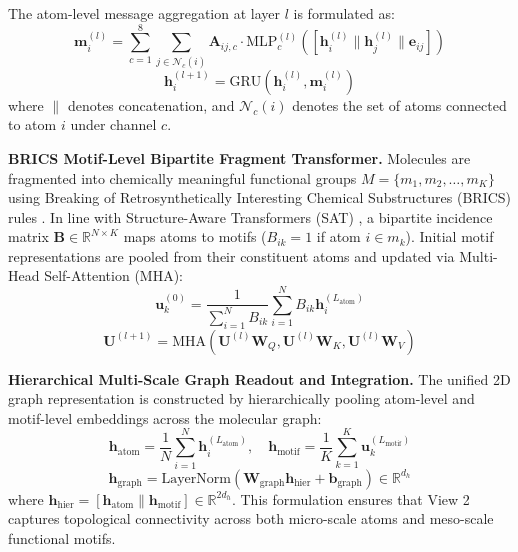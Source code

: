 \documentclass[10pt,twocolumn]{article}
\begin{document}
The atom-level message aggregation at layer $l$ is formulated as:
\begin{equation}
\mathbf{m}_i^{(l)} = \sum_{c=1}^8 \sum_{j \in \mathcal{N}_c(i)} \mathbf{A}_{ij, c} \cdot \text{MLP}_c^{(l)}\left(\left[\mathbf{h}_i^{(l)} \parallel \mathbf{h}_j^{(l)} \parallel \mathbf{e}_{ij}\right]\right)
\label{eq:msgg_msg}
\end{equation}
\begin{equation}
\mathbf{h}_i^{(l+1)} = \text{GRU}\left(\mathbf{h}_i^{(l)}, \mathbf{m}_i^{(l)}\right)
\label{eq:msgg_update}
\end{equation}
where $\parallel$ denotes concatenation, and $\mathcal{N}_c(i)$ denotes the set of atoms connected to atom $i$ under channel $c$.

\noindent\textbf{BRICS Motif-Level Bipartite Fragment Transformer.} Molecules are fragmented into chemically meaningful functional groups $M = \{m_1, m_2, \dots, m_K\}$ using Breaking of Retrosynthetically Interesting Chemical Substructures (BRICS) rules \cite{degen2008art, yang2021fragat, zhang2025property}. In line with Structure-Aware Transformers (SAT) \cite{chen2022structure}, a bipartite incidence matrix $\mathbf{B} \in \mathbb{R}^{N \times K}$ maps atoms to motifs ($B_{ik} = 1$ if atom $i \in m_k$). Initial motif representations are pooled from their constituent atoms and updated via Multi-Head Self-Attention (MHA):
\begin{equation}
\mathbf{u}_k^{(0)} = \frac{1}{\sum_{i=1}^N B_{ik}} \sum_{i=1}^N B_{ik} \mathbf{h}_i^{(L_{\text{atom}})}
\label{eq:motif_init}
\end{equation}
\begin{equation}
\mathbf{U}^{(l+1)} = \text{MHA}\left(\mathbf{U}^{(l)}\mathbf{W}_Q, \mathbf{U}^{(l)}\mathbf{W}_K, \mathbf{U}^{(l)}\mathbf{W}_V\right)
\label{eq:motif_attn}
\end{equation}

\noindent\textbf{Hierarchical Multi-Scale Graph Readout and Integration.} The unified 2D graph representation is constructed by hierarchically pooling atom-level and motif-level embeddings across the molecular graph:
\begin{equation}
\mathbf{h}_{\text{atom}} = \frac{1}{N}\sum_{i=1}^N \mathbf{h}_i^{(L_{\text{atom}})}, \quad \mathbf{h}_{\text{motif}} = \frac{1}{K}\sum_{k=1}^K \mathbf{u}_k^{(L_{\text{motif}})}
\end{equation}
\begin{equation}
\mathbf{h}_{\text{graph}} = \text{LayerNorm}\left(\mathbf{W}_{\text{graph}} \mathbf{h}_{\text{hier}} + \mathbf{b}_{\text{graph}}\right) \in \mathbb{R}^{d_h}
\label{eq:graph_pool}
\end{equation}
where $\mathbf{h}_{\text{hier}} = [\mathbf{h}_{\text{atom}} \parallel \mathbf{h}_{\text{motif}}] \in \mathbb{R}^{2d_h}$. This formulation ensures that View 2 captures topological connectivity across both micro-scale atoms and meso-scale functional motifs.
\end{document}
